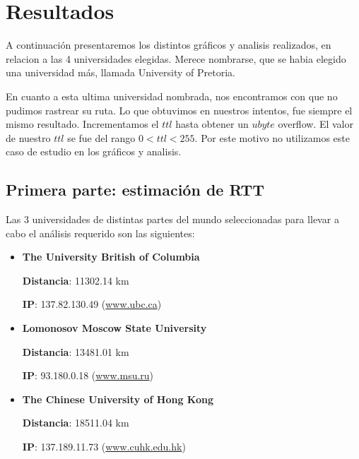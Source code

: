 \section{Resultados}
A continuaci\'on presentaremos los distintos gr\'aficos y analisis realizados, en relacion a las 4 universidades elegidas. Merece nombrarse, que se habia elegido una universidad m\'as, llamada University of Pretoria.

En cuanto a esta ultima universidad nombrada, nos encontramos con que no pudimos rastrear su ruta. Lo que obtuvimos en nuestros intentos, fue siempre el mismo resultado. Incrementamos el $ttl$ hasta obtener un $ubyte$ overflow. El valor de nuestro $ttl$ se fue del rango $0 < ttl < 255$.
Por este motivo no utilizamos este caso de estudio en los gr\'aficos y analisis.






\subsection{Primera parte: estimación de RTT}
Las 3 universidades de distintas partes del mundo seleccionadas para llevar a cabo el análisis requerido son las siguientes: 

\begin{itemize}
 \item {\bf The University British of Columbia}
 
	{\bf Distancia}: 11302.14 km 
	
	{\bf IP}: 137.82.130.49 (\url{www.ubc.ca}{})
 
 \item {\bf Lomonosov Moscow State University}

	{\bf Distancia}: 13481.01 km
	
	{\bf IP}: 93.180.0.18 (\url{www.msu.ru}{})
 
 \item {\bf The Chinese University of Hong Kong}

	{\bf Distancia}: 18511.04 km
	
	{\bf IP}: 137.189.11.73 (\url{www.cuhk.edu.hk})
 
\end{itemize}

